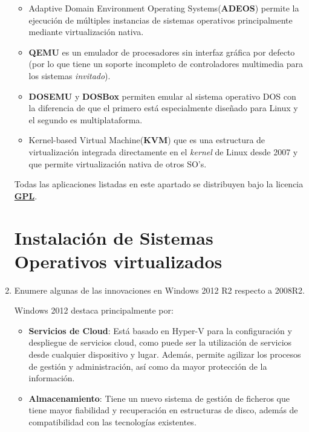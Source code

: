 \documentclass[paper=a4, fontsize=11pt]{scrartcl} %
\numberwithin{equation}{section} %
\numberwithin{figure}{section} %
\numberwithin{table}{section} %
\begin{document}
\begin{enumerate}
		\begin{itemize}
			\item Adaptive Domain Environment Operating Systems(\textbf{ADEOS}\cite{Adeos}) permite
			la ejecución de múltiples instancias de sistemas operativos principalmente mediante
			virtualización nativa.
			
			\item \textbf{QEMU}\cite{QEMU} es un emulador de procesadores sin interfaz gráfica por
			defecto (por lo que tiene un soporte incompleto de controladores multimedia para los
			sistemas \textit{invitado}).
			
			\item \textbf{DOSEMU}\cite{DOSEMU} y \textbf{DOSBox}\cite{DOSBox} permiten emular al
			sistema operativo DOS con la diferencia de que el primero está especialmente diseñado
			para Linux y el segundo es multiplataforma.
			
			\item Kernel-based Virtual Machine(\textbf{KVM}\cite{KVM}) que es una estructura de 
			virtualización integrada directamente en el \textit{kernel} de Linux desde 2007 y que
			permite virtualización nativa de otros SO's.
		\end{itemize}
		
		Todas las aplicaciones listadas en este apartado se distribuyen bajo la licencia
		\href{https://www.gnu.org/licenses/gpl.html}{\textbf{GPL}}.
		
	\section{Instalación de Sistemas Operativos virtualizados}
		\item Enumere algunas de las innovaciones en Windows 2012 R2 respecto a 2008R2.
		
		Windows 2012 destaca principalmente por:
		\begin{itemize}
			\item \textbf{Servicios de Cloud}\cite{Hoja_Datos}\cite{Overview}\cite{TechWeek}:
			Está basado en Hyper-V para la configuración y despliegue de servicios cloud, como
			puede ser la utilización de servicios desde cualquier dispositivo y lugar. Además,
			permite agilizar los procesos de gestión y administración, así como da mayor
			protección de la información.
			
			\item \textbf{Almacenamiento}\cite{TechWeek}: Tiene un nuevo sistema de gestión de
			ficheros que tiene mayor fiabilidad y recuperación en estructuras de disco, además
			de compatibilidad con las tecnologías existentes.
			

\end{itemize}
\end{enumerate}
\end{document}
